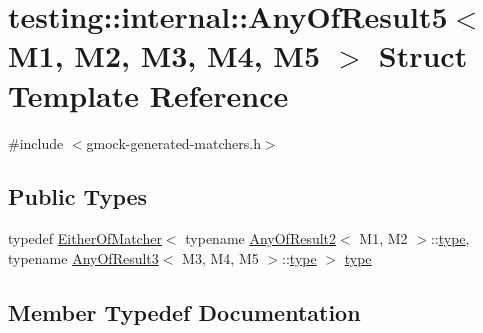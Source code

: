 \hypertarget{structtesting_1_1internal_1_1_any_of_result5}{}\section{testing\+:\+:internal\+:\+:Any\+Of\+Result5$<$ M1, M2, M3, M4, M5 $>$ Struct Template Reference}
\label{structtesting_1_1internal_1_1_any_of_result5}


{\ttfamily \#include $<$gmock-\/generated-\/matchers.\+h$>$}

\subsection*{Public Types}
\begin{DoxyCompactItemize}
\item 
typedef \hyperlink{classtesting_1_1internal_1_1_either_of_matcher}{Either\+Of\+Matcher}$<$ typename \hyperlink{structtesting_1_1internal_1_1_any_of_result2}{Any\+Of\+Result2}$<$ M1, M2 $>$\+::\hyperlink{structtesting_1_1internal_1_1_any_of_result5_a459a06dc5791313dce942668714f0c99}{type}, typename \hyperlink{structtesting_1_1internal_1_1_any_of_result3}{Any\+Of\+Result3}$<$ M3, M4, M5 $>$\+::\hyperlink{structtesting_1_1internal_1_1_any_of_result5_a459a06dc5791313dce942668714f0c99}{type} $>$ \hyperlink{structtesting_1_1internal_1_1_any_of_result5_a459a06dc5791313dce942668714f0c99}{type}
\end{DoxyCompactItemize}


\subsection{Member Typedef Documentation}
\mbox{\label{structtesting_1_1internal_1_1_any_of_result5_a459a06dc5791313dce942668714f0c99}} 
